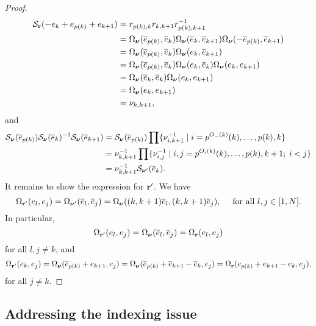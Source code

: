 \begin{proof}
\begin{align*}
		\mathcal{S}_{\mathbf{r}}(-e_k + e_{p(k)} + e_{k+1})
		 & = r_{p(k),k}r_{k,k+1}r_{p(k), k+1}^{-1}                                                                 \\
		 & = \Omega_{\boldsymbol{\nu}}(\overline{e}_{p(k)}, \overline{e}_k)\Omega_{\boldsymbol{\nu}}(\overline{e}_k, \overline{e}_{k+1})\Omega_{\boldsymbol{\nu}}(-\overline{e}_{p(k)}, \overline{e}_{k+1}) \\
		 & = \Omega_{\boldsymbol{\nu}}(\overline{e}_{p(k)}, \overline{e}_k)\Omega_{\boldsymbol{\nu}}(e_k, \overline{e}_{k+1})                                        \\
		 & = \Omega_{\boldsymbol{\nu}}(\overline{e}_{p(k)}, \overline{e}_k)\Omega_{\boldsymbol{\nu}}(e_k, \overline{e}_{k})\Omega_{\boldsymbol{\nu}}(e_k, e_{k+1})               \\
		 & = \Omega_{\boldsymbol{\nu}}(\overline{e}_{k}, \overline{e}_k)\Omega_{\boldsymbol{\nu}}(e_k, e_{k+1})                                             \\
		 & = \Omega_{\boldsymbol{\nu}}(e_k, e_{k+1})                                                                          \\
		 & = \nu_{k, k+1},
	\end{align*}
	and
	\begin{align*}
		\mathcal{S}_{\boldsymbol{\nu}}(\overline{e}_{p(k)})\mathcal{S}_{\boldsymbol{\nu}}(\overline{e}_k)^{-1} \mathcal{S}_{\boldsymbol{\nu}}(\overline{e}_{k+1})
		 & = \mathcal{S}_{\boldsymbol{\nu}}(\overline{e}_{p(k)})\prod \{\nu_{i, k+1}^{-1} \mid i = p^{O_{-}(k)}(k), \dots, p(k), k\}        \\
		 & = \nu_{k, k+1}^{-1}  \prod \{\nu_{i, j}^{-1} \mid i,j = p^{O_{i}(k)}(k), \dots, p(k), k+1; \; i < j\} \\
		 & = \nu_{k, k+1}^{-1}\mathcal{S}_{\boldsymbol{\nu}'}(\overline{e}_k).
	\end{align*}
	It remains to show the expression for $\mathbf{r}'$. We have
	\begin{equation*}
		\Omega_{\mathbf{r}'}(e_l, e_j) = \Omega_{\boldsymbol{\nu}'}(\overline{e}_l, \overline{e}_j) = \Omega_{\boldsymbol{\nu}}((k, k+1)\overline{e}_l, (k, k+1)\overline{e}_j), \quad \text{ for all } l,j \in [1, N].
	\end{equation*}
	In particular,
	\begin{equation*}
		\Omega_{\mathbf{r}'}(e_l, e_j) = \Omega_{\boldsymbol{\nu}}(\overline{e}_l, \overline{e}_j) = \Omega_{\mathbf{r}}(e_l, e_j)
	\end{equation*}
	for all $l, j \neq k$, and
	\begin{equation*}
		\Omega_{\mathbf{r}'}(e_k, e_j) = \Omega_{\boldsymbol{\nu}}(\overline{e}_{p(k)} + e_{k+1}, e_j) = \Omega_{\boldsymbol{\nu}}(\overline{e}_{p(k)} + \overline{e}_{k+1} - \overline{e}_k, e_j) = \Omega_{\mathbf{r}}(e_{p(k)} + e_{k+1} - e_k , e_j),
	\end{equation*}
	for all $j \neq k$.
\end{proof}

\subsection{Addressing the indexing issue}

